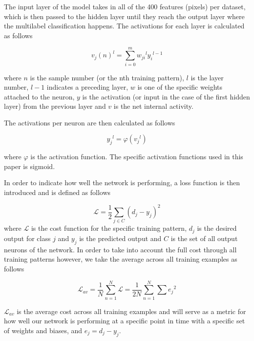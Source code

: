 \documentclass{article} %
\theoremstyle{definition}
\theoremstyle{remark}
\theoremstyle{plain}
\begin{document}
The input layer of the model takes in all of the 400 features (pixels) per dataset, which is then passed to the hidden layer until they reach the output layer where the multilabel classification happens. The activations for each layer is calculated as follows

\begin{equation}\label{net_int}
	{v_j(n)}^{l} = \sum_{i=0}^{m} {w_{ji}}^{l} {y_i}^{l-1}
\end{equation}

where $n$ is the sample number (or the nth training pattern), $l$ is the layer number, $l-1$ indicates a preceding layer, $w$ is one of the specific weights attached to the neuron, $y$ is the activation (or input in the case of the first hidden layer) from the previous layer and $v$ is the net internal activity. 

The activations per neuron are then calculated as follows

\begin{equation}\label{activ}
	{y_j}^{l} = \varphi({v_j}^{l})
\end{equation}

where $\varphi$ is the activation function. The specific activation functions used in this paper is sigmoid.

In order to indicate how well the network is performing, a loss function is then introduced and is defined as follows

\begin{equation}\label{cost}
	\mathcal{L} = \frac{1}{2} \sum_{j \in C} \left( d_j - y_j \right)^2
\end{equation}
where $\mathcal{L}$ is the cost function for the specific training pattern, $d_j$ is the desired output for class $j$ and $y_j$ is the predicted output and $C$ is the set of all output neurons of the network. In order to take into account the full cost through all training patterns however, we take the average across all training examples as follows

\begin{equation}\label{avg_cost}
	\mathcal{L}_{av}  =  \frac {1}{N}  \sum _ {n=1}^ {N}  \mathcal{L} =  \frac {1}{2N}  \sum _ {n=1}^ {N}  \sum  {e_{j}}^{2}
\end{equation}

$\mathcal{L}_{av}$ is the average cost across all training examples and will serve as a metric for how well our network is performing at a specific point in time with a specific set of weights and biases, and $e_j = d_j-y_j$.
\end{document}
